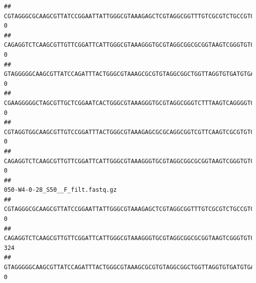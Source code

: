 \documentclass[]{article}
\begin{document}
\begin{verbatim}
## CGTAGGGCGCAAGCGTTATCCGGAATTATTGGGCGTAAAGAGCTCGTAGGCGGTTTGTCGCGTCTGCCGTGAAAGTCCGGGGCTCAACTCCGGATCTGCGGTGGGTACGGGCAGACTAGAGTGATGTAGGGGAGACTGGAATTCCTGGTGTAGCGGTGAAATGCGCAGATATCAGGAGGAACACCGATGGCGAAGGCAGGTCTCTGGGCATTAACTGACGCTGAGGAGCGAAAGCATGGGGAGCGAACA                                   0
## CAGAGGTCTCAAGCGTTGTTCGGATTCATTGGGCGTAAAGGGTGCGTAGGCGGCGCGGTAAGTCGGGTGTGAAATCTCGGAGCTTAACTCCGAAACTGCATTCGATACTGCCGTGCTTGAGGACTGGAGAGGAGACTGGAATTTACGGTGTAGCGGTGAAATGCGTAGATATCGTAAGGAAGACCAGTGGCGAAGGCGGGTCTCTGGACAGTTCCTGACGCTGAGGCACGAAGGCCAGGGGAGCAAACG                                   0
## GTAGGGGGCAAGCGTTATCCAGATTTACTGGGCGTAAAGCGCGTGTAGGCGGCTGGTTAGGTGTGATGTGAAATCTTCCGGCTCAACCGGAAAACTGCATTGCAAACCGGCCTGGCTAGAGTGCAGGAGAGGGAAGCGGAATTCCAGGTGTAGCGGTGAAATGCGTAGATATCTGGAGGAACACCAGTGGCGAAGGCGGCTTCCTGGCCTGCAACTGACGCTGAGACGCGAAAGCGTGGGGAGCGAAC                                    0
## CGAAGGGGGCTAGCGTTGCTCGGAATCACTGGGCGTAAAGGGTGCGTAGGCGGGTCTTTAAGTCAGGGGTGAAATCCTGGAGCTCAACTCCAGAACTGCCTTTGATACTGAAGATCTTGAGTTCGGGAGAGGTGAGTGGAACTGCGAGTGTAGAGGTGAAATTCGTAGATATTCGCAAGAACACCAGTGGCGAAGGCGGCTCACTGGCCCGATACTGACGCTGAGGCACGAAAGCGTGGGGAGCAAACA                                   0
## CGTAGGTGGCAAGCGTTGTCCGGATTTACTGGGCGTAAAGAGCGCGCAGGCGGTCGTTCAAGTCGCGTGTGAAAGCCCCCGGCTCAACTGGGGAGGGTCACGCGATACTGATCGACTCGAAGGCAGGAGAGGGTAGTGGAATTCCCGGTGTAGTGGTGAAATGCGTAGATATCGGGAGGAACACCAGTGGCGAAGGCGACTACCTGGCCTGTTCTTGACGCTGAGGCGCGAAAGCTAGGGGAGCAAACG                                   0
## CAGAGGTCTCAAGCGTTGTTCGGATTCATTGGGCGTAAAGGGTGCGTAGGCGGCGCGGTAAGTCGGGTGTGAAATCTCGGGGCTTAACTCCGAAACTGCATTCGATACTGCCGTGCTTGAGGACTGGAGAGGAGACTGGAATTTACGGTGTAGCGGTGAAATGCGTAGATATCGTAAGGAAGACCAGTGGCGAAGGCGGGTCTCTGGACAGTTCCTGACGCTGAGGCACGAAGGCCAGGGGAGCAAACG                                   0
##                                                                                                                                                                                                                                                           050-W4-0-28_S50__F_filt.fastq.gz
## CGTAGGGCGCAAGCGTTATCCGGAATTATTGGGCGTAAAGAGCTCGTAGGCGGTTTGTCGCGTCTGCCGTGAAAGTCCGGGGCTCAACTCCGGATCTGCGGTGGGTACGGGCAGACTAGAGTGATGTAGGGGAGACTGGAATTCCTGGTGTAGCGGTGAAATGCGCAGATATCAGGAGGAACACCGATGGCGAAGGCAGGTCTCTGGGCATTAACTGACGCTGAGGAGCGAAAGCATGGGGAGCGAACA                                0
## CAGAGGTCTCAAGCGTTGTTCGGATTCATTGGGCGTAAAGGGTGCGTAGGCGGCGCGGTAAGTCGGGTGTGAAATCTCGGAGCTTAACTCCGAAACTGCATTCGATACTGCCGTGCTTGAGGACTGGAGAGGAGACTGGAATTTACGGTGTAGCGGTGAAATGCGTAGATATCGTAAGGAAGACCAGTGGCGAAGGCGGGTCTCTGGACAGTTCCTGACGCTGAGGCACGAAGGCCAGGGGAGCAAACG                              324
## GTAGGGGGCAAGCGTTATCCAGATTTACTGGGCGTAAAGCGCGTGTAGGCGGCTGGTTAGGTGTGATGTGAAATCTTCCGGCTCAACCGGAAAACTGCATTGCAAACCGGCCTGGCTAGAGTGCAGGAGAGGGAAGCGGAATTCCAGGTGTAGCGGTGAAATGCGTAGATATCTGGAGGAACACCAGTGGCGAAGGCGGCTTCCTGGCCTGCAACTGACGCTGAGACGCGAAAGCGTGGGGAGCGAAC                                 0

\end{verbatim}
\end{document}
